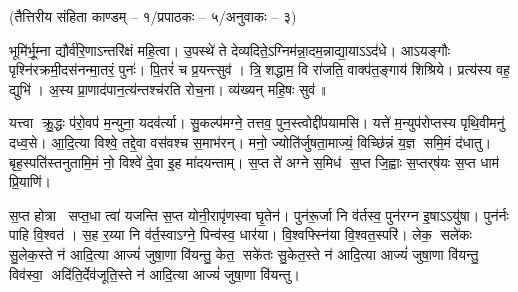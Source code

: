 \centerline{\normalsize (तैत्तिरीय संहिता काण्डम् – १/प्रपाठकः – ५/अनुवाकः – ३)}

भूमि॑र्भू॒म्ना द्यौर्व॑रि॒णाऽन्तरि॑क्षं महि॒त्वा। उ॒पस्थे॑ ते देव्यदिते॒ऽग्नि\-म॑न्ना॒दम॒न्नाद्या॒याऽऽद॑धे।
आऽयङ्गौः पृश्नि॑रक्रमी॒\-दस॑नन्मा॒तरं॒ पुनः॑। पि॒तरं॑ च प्र॒यन्त्सुव॑।
त्रि॒शद्धाम॒ वि रा॑जति॒ वाक्प॑त॒ङ्गाय॑ शिश्रिये। प्रत्य॑स्य वह॒ द्युभि॑। अ॒स्य प्रा॒णाद॑पान॒त्य॑न्तश्च॑रति रोच॒ना।
व्य॑ख्यन् महि॒षः सुव॑॥

यत्त्वा क्रु॒द्धः प॑रो॒वप॑ म॒न्युना॒ यदव॑र्त्या। सु॒कल्प॑मग्ने॒ तत्तव॒ पुन॒स्त्वोद्दी॑पयामसि।
यत्ते॑ म॒न्युप॑रोप्तस्य पृथि॒वीमनु॑ दध्व॒से। आ॒दि॒त्या विश्वे॒ तद्दे॒वा वस॑वश्च स॒माभ॑रन्।
मनो॒ ज्योति॑र्जुषता॒माज्यं॒ विच्छि॑न्नं य॒ज्ञ समि॒मं द॑धातु। बृह॒स्पति॑स्तनुतामि॒मं नो॒ विश्वे॑ दे॒वा इ॒ह मा॑दयन्ताम्।
 स॒प्त ते॑ अग्ने स॒मिध॑ स॒प्त जि॒ह्वाः स॒प्तर्‌ष॑यः स॒प्त धाम॑ प्रि॒याणि॑। 

स॒प्त होत्रा सप्त॒धा त्वा॑ यजन्ति स॒प्त योनी॒रापृ॑णस्वा घृ॒तेन॑। पुन॑रू॒र्जा नि व॑र्तस्व॒ पुन॑रग्न इ॒षाऽऽयु॑षा। पुन॑र्नः पाहि वि॒श्वत॑। स॒ह र॒य्या नि व॑र्त॒स्वाऽग्ने॒ पिन्व॑स्व॒ धार॑या। वि॒श्वफ्स्नि॑या वि॒श्वत॒स्परि॑। लेक॒ सले॑कः सु॒लेक॒स्ते न॑ आदि॒त्या आज्यं॑ जुषा॒णा वि॑यन्तु॒ केत॒ सके॑तः सु॒केत॒स्ते न॑ आदि॒त्या आज्यं॑ जुषा॒णा वि॑यन्तु॒ विव॑स्वा॒ अदि॑ति॒र्देव॑जूति॒स्ते न॑ आदि॒त्या आज्यं॑ जुषा॒णा वि॑यन्तु।

